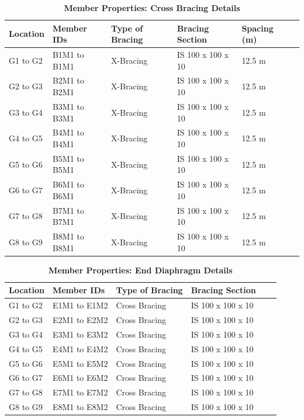 \documentclass[12pt,a4paper]{report}
\numberwithin{table}{chapter}
\numberwithin{figure}{chapter}
\begin{document}
\newpage

\vspace{0.4em}
\setlength{\tabcolsep}{4pt}
\setlength\LTleft{0pt}
\setlength\LTright{\fill}

\begin{longtable}{|L{2.2cm}|L{2.2cm}|L{3.0cm}|L{2.5cm}|C{1.8cm}|C{1.8cm}|}
\caption{\textbf{Member Properties: Cross Bracing Details}}
\hline
\textbf{Location} & \textbf{Member IDs} & \textbf{Type of Bracing} & \textbf{Bracing Section} & \textbf{Spacing (m)} \\
\hline
G1 to G2 & B1M1 to B1M1 & X-Bracing & IS 100 x 100 x 10 & 12.5 m \\[6pt]
\hline
G2 to G3 & B2M1 to B2M1 & X-Bracing & IS 100 x 100 x 10 & 12.5 m \\[6pt]
\hline
G3 to G4 & B3M1 to B3M1 & X-Bracing & IS 100 x 100 x 10 & 12.5 m \\[6pt]
\hline
G4 to G5 & B4M1 to B4M1 & X-Bracing & IS 100 x 100 x 10 & 12.5 m \\[6pt]
\hline
G5 to G6 & B5M1 to B5M1 & X-Bracing & IS 100 x 100 x 10 & 12.5 m \\[6pt]
\hline
G6 to G7 & B6M1 to B6M1 & X-Bracing & IS 100 x 100 x 10 & 12.5 m \\[6pt]
\hline
G7 to G8 & B7M1 to B7M1 & X-Bracing & IS 100 x 100 x 10 & 12.5 m \\[6pt]
\hline
G8 to G9 & B8M1 to B8M1 & X-Bracing & IS 100 x 100 x 10 & 12.5 m \\[6pt]
\hline
\end{longtable}

\vspace{0.4em}
\noindent
\setlength{\tabcolsep}{4pt}
\setlength\LTleft{0pt}
\setlength\LTright{\fill}

\begin{longtable}{|L{2.2cm}|L{2.2cm}|L{3.0cm}|L{2.5cm}|C{1.8cm}|C{1.8cm}|}
\caption{\textbf{Member Properties: End Diaphragm Details}}
\hline
\textbf{Location} & \textbf{Member IDs} & \textbf{Type of Bracing} & \textbf{Bracing Section} \\
\hline
G1 to G2 & E1M1 to E1M2 & Cross Bracing & IS 100 x 100 x 10 \\[6pt]
\hline
G2 to G3 & E2M1 to E2M2 & Cross Bracing & IS 100 x 100 x 10 \\[6pt]
\hline
G3 to G4 & E3M1 to E3M2 & Cross Bracing & IS 100 x 100 x 10 \\[6pt]
\hline
G4 to G5 & E4M1 to E4M2 & Cross Bracing & IS 100 x 100 x 10 \\[6pt]
\hline
G5 to G6 & E5M1 to E5M2 & Cross Bracing & IS 100 x 100 x 10 \\[6pt]
\hline
G6 to G7 & E6M1 to E6M2 & Cross Bracing & IS 100 x 100 x 10 \\[6pt]
\hline
G7 to G8 & E7M1 to E7M2 & Cross Bracing & IS 100 x 100 x 10 \\[6pt]
\hline
G8 to G9 & E8M1 to E8M2 & Cross Bracing & IS 100 x 100 x 10 \\[6pt]
\hline
\end{longtable}
\end{document}
